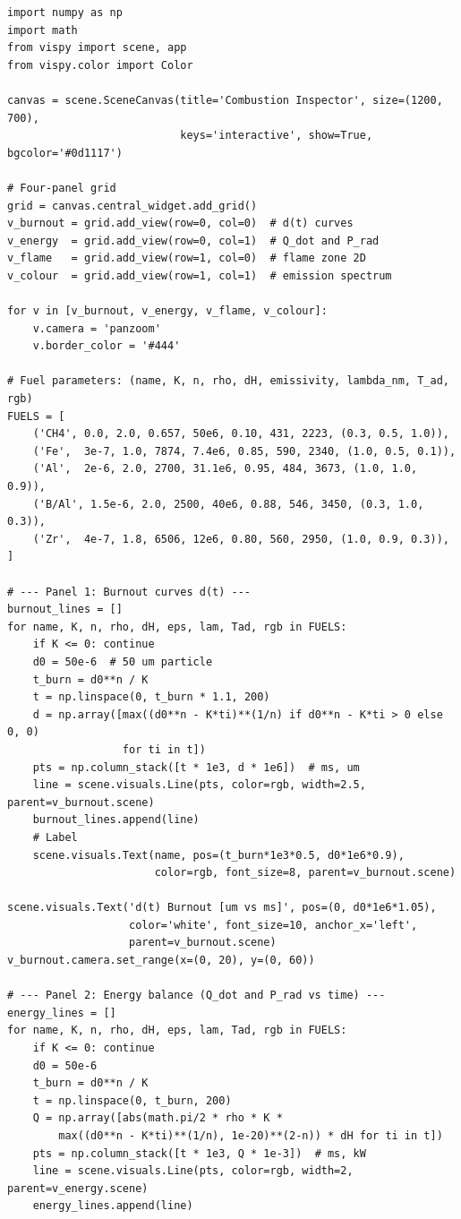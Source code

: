 \documentclass[11pt,a4paper]{article}
\begin{document}
\begin{lstlisting}[title={\textbf{Live Flame Speed \& Energy Dashboard}}]
import numpy as np
import math
from vispy import scene, app
from vispy.color import Color

canvas = scene.SceneCanvas(title='Combustion Inspector', size=(1200, 700),
                           keys='interactive', show=True, bgcolor='#0d1117')

# Four-panel grid
grid = canvas.central_widget.add_grid()
v_burnout = grid.add_view(row=0, col=0)  # d(t) curves
v_energy  = grid.add_view(row=0, col=1)  # Q_dot and P_rad
v_flame   = grid.add_view(row=1, col=0)  # flame zone 2D
v_colour  = grid.add_view(row=1, col=1)  # emission spectrum

for v in [v_burnout, v_energy, v_flame, v_colour]:
    v.camera = 'panzoom'
    v.border_color = '#444'

# Fuel parameters: (name, K, n, rho, dH, emissivity, lambda_nm, T_ad, rgb)
FUELS = [
    ('CH4', 0.0, 2.0, 0.657, 50e6, 0.10, 431, 2223, (0.3, 0.5, 1.0)),
    ('Fe',  3e-7, 1.0, 7874, 7.4e6, 0.85, 590, 2340, (1.0, 0.5, 0.1)),
    ('Al',  2e-6, 2.0, 2700, 31.1e6, 0.95, 484, 3673, (1.0, 1.0, 0.9)),
    ('B/Al', 1.5e-6, 2.0, 2500, 40e6, 0.88, 546, 3450, (0.3, 1.0, 0.3)),
    ('Zr',  4e-7, 1.8, 6506, 12e6, 0.80, 560, 2950, (1.0, 0.9, 0.3)),
]

# --- Panel 1: Burnout curves d(t) ---
burnout_lines = []
for name, K, n, rho, dH, eps, lam, Tad, rgb in FUELS:
    if K <= 0: continue
    d0 = 50e-6  # 50 um particle
    t_burn = d0**n / K
    t = np.linspace(0, t_burn * 1.1, 200)
    d = np.array([max((d0**n - K*ti)**(1/n) if d0**n - K*ti > 0 else 0, 0)
                  for ti in t])
    pts = np.column_stack([t * 1e3, d * 1e6])  # ms, um
    line = scene.visuals.Line(pts, color=rgb, width=2.5, parent=v_burnout.scene)
    burnout_lines.append(line)
    # Label
    scene.visuals.Text(name, pos=(t_burn*1e3*0.5, d0*1e6*0.9),
                       color=rgb, font_size=8, parent=v_burnout.scene)

scene.visuals.Text('d(t) Burnout [um vs ms]', pos=(0, d0*1e6*1.05),
                   color='white', font_size=10, anchor_x='left',
                   parent=v_burnout.scene)
v_burnout.camera.set_range(x=(0, 20), y=(0, 60))

# --- Panel 2: Energy balance (Q_dot and P_rad vs time) ---
energy_lines = []
for name, K, n, rho, dH, eps, lam, Tad, rgb in FUELS:
    if K <= 0: continue
    d0 = 50e-6
    t_burn = d0**n / K
    t = np.linspace(0, t_burn, 200)
    Q = np.array([abs(math.pi/2 * rho * K *
        max((d0**n - K*ti)**(1/n), 1e-20)**(2-n)) * dH for ti in t])
    pts = np.column_stack([t * 1e3, Q * 1e-3])  # ms, kW
    line = scene.visuals.Line(pts, color=rgb, width=2, parent=v_energy.scene)
    energy_lines.append(line)


\end{lstlisting}
\end{document}
